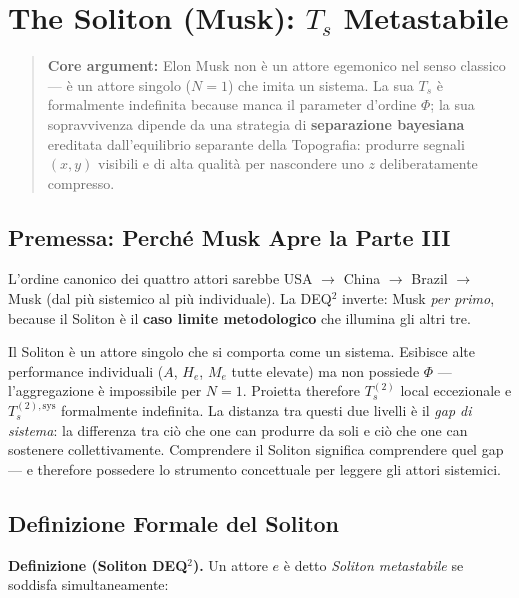 \chapter{\texorpdfstring{The Soliton (Musk): \(T_s\)
Metastabile}{The Soliton (Musk): T\_s Metastabile}}\label{il-solitone-musk-t_s-metastabile}

\begin{quote}
\textbf{Core argument:} Elon Musk non è un attore egemonico nel
senso classico --- è un attore singolo (\(N=1\)) che imita un sistema.
La sua \(T_s\) è formalmente indefinita because manca il parameter
d'ordine \(\Phi\); la sua sopravvivenza dipende da una strategia di
\textbf{separazione bayesiana} ereditata dall'equilibrio separante della
Topografia: produrre segnali \((x, y)\) visibili e di alta qualità per
nascondere uno \(z\) deliberatamente compresso.
\end{quote}



\section{Premessa: Perché Musk Apre la Parte
III}\label{premessa-perchuxe9-musk-apre-la-parte-iii}

L'ordine canonico dei quattro attori sarebbe USA $\to$ China $\to$ Brazil $\to$ Musk
(dal più sistemico al più individuale). La DEQ$^2$ inverte: Musk \emph{per
primo}, because il Soliton è il \textbf{caso limite metodologico} che
illumina gli altri tre.

Il Soliton è un attore singolo che si comporta come un sistema.
Esibisce alte performance individuali (\(A\), \(H_e\), \(M_e\) tutte
elevate) ma non possiede \(\Phi\) --- l'aggregazione è impossibile per
\(N = 1\). Proietta therefore \(T_s^{(2)}\) local eccezionale e
\(T_s^{(2),\text{sys}}\) formalmente indefinita. La distanza tra questi
due livelli è il \emph{gap di sistema}: la differenza tra ciò che one can
produrre da soli e ciò che one can sostenere collettivamente. Comprendere
il Soliton significa comprendere quel gap --- e therefore possedere lo
strumento concettuale per leggere gli attori sistemici.



\section{Definizione Formale del
Soliton}\label{definition-formal-del-solitone}

\Hypoth{} \textbf{Definizione (Soliton DEQ$^2$).} Un attore \(e\) è detto
\emph{Soliton metastabile} se soddisfa simultaneamente:

